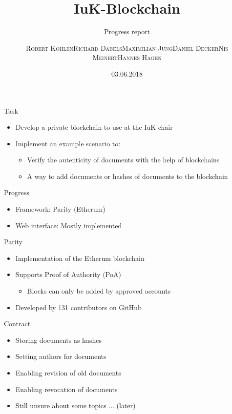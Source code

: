 \documentclass[10pt]{beamer}
\title{IuK-Blockchain}
\subtitle{Progress report}
\author{\textsc{Robert Kohlen}\newline\textsc{Richard Dabels}\newline\textsc{Maximilian Jung}\newline\textsc{Daniel Decker}\newline\textsc{Nis Meinert}\newline\textsc{Hannes Hagen}}
\date{03.06.2018}
\begin{document}
\begin{frame}
	\titlepage
\end{frame}

\begin{frame}{Task}
	\begin{itemize}
		\item Develop a private blockchain to use at the IuK chair
		\item Implement an example scenario to:
		\begin{itemize}
			\item Verify the autenticity of documents with the help of blockchains
			\item A way to add documents or hashes of documents to the blockchain
		\end{itemize}
	\end{itemize}
\end{frame}

\begin{frame}{Progress}
	\begin{itemize}
		\item Framework: Parity (Etherum)
		\item Web interface: Mostly implemented
	\end{itemize}
\end{frame}

\begin{frame}{Parity}
	\begin{itemize}
		\item Implementation of the Etherum blockchain
		\item Supports Proof of Authority (PoA)
		\begin{itemize}
			\item Blocks can only be added by approved accounts
		\end{itemize}
		\item Developed by 131 contributors on GitHub
	\end{itemize}
\end{frame}

\begin{frame}{Contract}
	\begin{itemize}
		\item Storing documents as hashes
		\item Setting authors for documents
		\item Enabling revision of old documents
		\item Enabling revocation of documents
		\item Still unsure about some topics ... (later)
	\end{itemize}
\end{frame}
\end{document}
